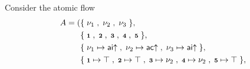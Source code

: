 \documentclass[a4paper]{LMCS}
\begin{document}
\begin{exa}
Consider the atomic flow
\begin{align*}
A=(&\{\;\nu_1\;,\;\nu_2\;,\;\nu_3\;\},\\
   &\{\;{{\mathchoice{\scriptstyle\mathbf1}
                              {\scriptstyle\mathbf1}
                              {\scriptstyle\mathbf1}
                              {\scriptscriptstyle\mathbf1}}}\;,\;{{\mathchoice{\scriptstyle\mathbf2}
                              {\scriptstyle\mathbf2}
                              {\scriptstyle\mathbf2}
                              {\scriptscriptstyle\mathbf2}}}\;,\;{{\mathchoice{\scriptstyle\mathbf3}
                                {\scriptstyle\mathbf3}
                                {\scriptstyle\mathbf3}
                                {\scriptscriptstyle\mathbf3}}}\;,\;{{\mathchoice{\scriptstyle\mathbf4}
                                {\scriptstyle\mathbf4}
                                {\scriptstyle\mathbf4}
                                {\scriptscriptstyle\mathbf4}}}\;,\;{{\mathchoice{\scriptstyle\mathbf5}
                                {\scriptstyle\mathbf5}
                                {\scriptstyle\mathbf5}
                                {\scriptscriptstyle\mathbf5}}}\;\},\\
   &\{\;\nu_1\mapsto{{{\mathsf{ai}}{\uparrow}}}\;,\;\nu_2\mapsto{{{\mathsf{ac}}{\uparrow}}}\;,\;\nu_3\mapsto{{{\mathsf{ai}}{\uparrow}}}\;\},\\
   &\{\;{{\mathchoice{\scriptstyle\mathbf1}
                              {\scriptstyle\mathbf1}
                              {\scriptstyle\mathbf1}
                              {\scriptscriptstyle\mathbf1}}}\mapsto\top\;,\;{{\mathchoice{\scriptstyle\mathbf2}
                              {\scriptstyle\mathbf2}
                              {\scriptstyle\mathbf2}
                              {\scriptscriptstyle\mathbf2}}}\mapsto\top\;,\;{{\mathchoice{\scriptstyle\mathbf3}
                                {\scriptstyle\mathbf3}
                                {\scriptstyle\mathbf3}
                                {\scriptscriptstyle\mathbf3}}}\mapsto\nu_2\;,\;
        {{\mathchoice{\scriptstyle\mathbf4}
                                {\scriptstyle\mathbf4}
                                {\scriptstyle\mathbf4}
                                {\scriptscriptstyle\mathbf4}}}\mapsto\nu_2\;,\;{{\mathchoice{\scriptstyle\mathbf5}
                                {\scriptstyle\mathbf5}
                                {\scriptstyle\mathbf5}
                                {\scriptscriptstyle\mathbf5}}}\mapsto\top\;\},\\

\end{align*}
\end{exa}
\end{document}
